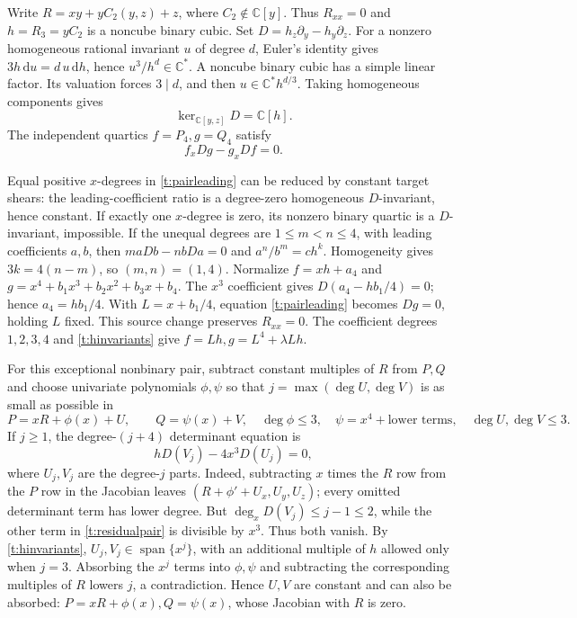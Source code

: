 \documentclass[11pt,reqno]{amsart}
\numberwithin{equation}{section}
\theoremstyle{plain}
\theoremstyle{definition}
\theoremstyle{remark}
\newcommand{\C}{\mathbb C}
\newcommand{\Span}{\operatorname{span}}
\begin{document}
Write $R=xy+yC_2(y,z)+z$, where $C_2\notin\C[y]$.
Thus $R_{xx}=0$ and $h=R_3=yC_2$ is a noncube binary cubic.
Set $D=h_z\partial_y-h_y\partial_z$.
For a nonzero homogeneous rational invariant $u$ of degree $d$, Euler's
identity gives $3h\,\mathrm du=d\,u\,\mathrm dh$, hence $u^3/h^d\in\C^*$.
A noncube binary cubic has a simple linear factor. Its valuation forces
$3\mid d$, and then $u\in\C^*h^{d/3}$. Taking homogeneous components gives
\begin{equation}\label{t:hinvariants}
 \ker_{\C[y,z]}D=\C[h].
\end{equation}
The independent quartics $f=P_4,g=Q_4$ satisfy
\begin{equation}\label{t:pairleading}
 f_xDg-g_xDf=0.
\end{equation}

Equal positive $x$-degrees in \eqref{t:pairleading} can be reduced by constant
target shears: the leading-coefficient ratio is a degree-zero homogeneous
$D$-invariant, hence constant. If exactly one $x$-degree is zero, its
nonzero binary quartic is a $D$-invariant, impossible.
If the unequal degrees are $1\le m<n\le4$, with leading coefficients $a,b$,
then $maDb-nbDa=0$ and $a^n/b^m=ch^k$. Homogeneity gives
$3k=4(n-m)$, so $(m,n)=(1,4)$.
Normalize $f=xh+a_4$ and $g=x^4+b_1x^3+b_2x^2+b_3x+b_4$.
The $x^3$ coefficient gives $D(a_4-hb_1/4)=0$; hence $a_4=hb_1/4$.
With $L=x+b_1/4$, equation \eqref{t:pairleading} becomes $Dg=0$, holding $L$
fixed. This source change preserves $R_{xx}=0$. The coefficient degrees
$1,2,3,4$ and \eqref{t:hinvariants} give
$f=Lh,g=L^4+\lambda Lh$.

For this exceptional nonbinary pair, subtract constant multiples of $R$
from $P,Q$ and choose univariate polynomials $\phi,\psi$ so that
$j=\max(\deg U,\deg V)$ is as small as possible in
\[
 P=xR+\phi(x)+U,\qquad Q=\psi(x)+V,
 \quad \deg\phi\le3,\quad \psi=x^4+\text{lower terms},\quad
 \deg U,\deg V\le3.
\]
If $j\ge1$, the degree-$(j+4)$ determinant equation is
\begin{equation}\label{t:residualpair}
 hD(V_j)-4x^3D(U_j)=0,
\end{equation}
where $U_j,V_j$ are the degree-$j$ parts. Indeed, subtracting $x$ times
the $R$ row from the $P$ row in the Jacobian leaves
$(R+\phi'+U_x,U_y,U_z)$; every omitted determinant term has lower degree.
But $\deg_xD(V_j)\le j-1\le2$, while the other term in
\eqref{t:residualpair} is divisible by $x^3$. Thus both vanish.
By \eqref{t:hinvariants}, $U_j,V_j\in\Span\{x^j\}$, with an additional
multiple of $h$ allowed only when $j=3$. Absorbing the $x^j$ terms into
$\phi,\psi$ and subtracting the corresponding multiples of $R$ lowers $j$,
a contradiction. Hence $U,V$ are constant and can also be absorbed:
$P=xR+\phi(x),Q=\psi(x)$, whose Jacobian with $R$ is zero.
\end{document}
